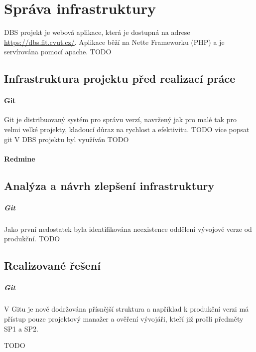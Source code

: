 \chapter{Správa infrastruktury} \label{infrastructure}

DBS projekt je webová aplikace, která je dostupná na adrese \url{https://dbs.fit.cvut.cz/}. Aplikace běží na Nette Frameworku (PHP) a je servírována pomocí apache.
TODO


\section{Infrastruktura projektu před realizací práce}

\subsubsection{Git}

Git \cite{git} je distribuovaný systém pro správu verzí, navržený jak pro malé tak pro velmi velké projekty, kladoucí důraz na rychlost a efektivitu.
TODO více popsat git
V DBS projektu byl využíván TODO

\subsubsection{Redmine} \label{infrastructure:redmine}


\section{Analýza a návrh zlepšení infrastruktury}

\paragraph{Git} Jako první nedostatek byla identifikována neexistence oddělení vývojové verze od produkční.
TODO


\section{Realizované řešení}

\paragraph{Git} V Gitu je nově dodržována přísnější struktura a například k produkční verzi má přístup pouze projektový manažer a ověření vývojáři, kteří již prošli předměty SP1 a SP2.

TODO

